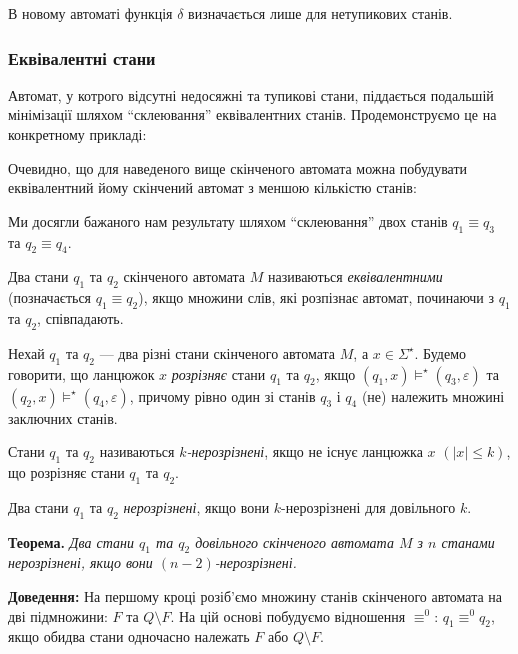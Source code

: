 В новому автоматі функція $\delta$ визначається лише для нетупикових станів.

\subsubsection{Еквівалентні стани}

Автомат, у котрого відсутні недосяжні та тупикові стани, піддається подальшій мінімізації шляхом ``склеювання'' еквівалентних станів. Продемонструємо це на конкретному прикладі:
\begin{figure}[H]
	\centering
	
\end{figure}

Очевидно, що для наведеного вище скінченого автомата можна побудувати еквівалентний йому скінчений автомат з меншою кількістю станів:
\begin{figure}[H]
	\centering
	
\end{figure}

Ми досягли бажаного нам результату шляхом ``склеювання'' двох станів $q_1 \equiv q_3$ та $q_2 \equiv q_4$. \medskip

Два стани $q_1$ та $q_2$ скінченого автомата $M$ називаються \textit{еквівалентними} (позначається $q_1 \equiv q_2$), якщо множини слів, які розпізнає автомат, починаючи з $q_1$ та $q_2$, співпадають. \medskip

Нехай $q_1$ та $q_2$ --- два різні стани скінченого автомата $M$, а $x \in \Sigma^\star$. Будемо говорити, що ланцюжок $x$ \textit{розрізняє} стани $q_1$ та $q_2$, якщо $(q_1,x) \models^\star (q_3, \varepsilon)$ та $(q_2,x) \models^\star (q_4, \varepsilon)$, причому рівно один зі станів $q_3$ і $q_4$ (не) належить множині заключних станів. \medskip

Стани $q_1$ та $q_2$ називаються \textit{$k$-нерозрізнені}, якщо не існує ланцюжка $x$ $(\left|x\right| \le k)$, що розрізняє стани $q_1$ та $q_2$. \medskip

Два стани $q_1$ та $q_2$ \textit{нерозрізнені}, якщо вони $k$-нерозрізнені для довільного $k$. \medskip

\textbf{Теорема.} \textit{Два стани $q_1$ та $q_2$ довільного скінченого автомата $M$ з $n$ станами нерозрізнені, якщо вони $(n - 2)$-нерозрізнені.} \medskip

\textbf{Доведення:} На першому кроці розіб'ємо множину станів скінченого автомата на дві підмножини: $F$ та $Q \setminus F$. На цій основі побудуємо відношення $\equiv^0$: $q_1 \equiv^0 q_2$, якщо обидва стани одночасно належать $F$ або $Q \setminus F$. \medskip

